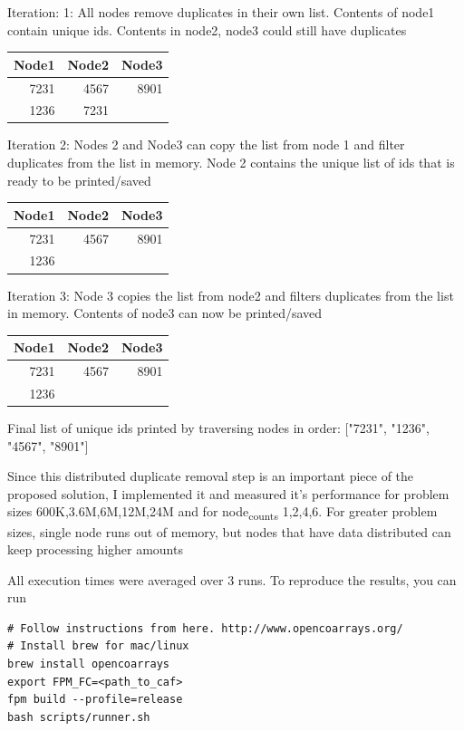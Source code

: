 \documentclass[11pt]{article}
\begin{document}
Iteration: 1: All nodes remove duplicates in their own list. Contents
of node1 contain unique ids. Contents in node2,
node3 could still have duplicates
\begin{center}
\begin{tabular}{rrr}
Node1 & Node2 & Node3\\
\hline
7231 & 4567 & 8901\\
1236 & 7231 & \\
\end{tabular}
\end{center}

Iteration 2: Nodes 2 and Node3 can copy the list from node 1 and
filter duplicates from the list in memory. Node 2 contains the
unique list of ids that is ready to be printed/saved
\begin{center}
\begin{tabular}{rrr}
Node1 & Node2 & Node3\\
\hline
7231 & 4567 & 8901\\
1236 &  & \\
\end{tabular}
\end{center}
Iteration 3: Node 3 copies the list from node2 and filters duplicates
from the list in memory. Contents of node3 can now be printed/saved
\begin{center}
\begin{tabular}{rrr}
Node1 & Node2 & Node3\\
\hline
7231 & 4567 & 8901\\
1236 &  & \\
\end{tabular}
\end{center}

Final list of unique ids printed by traversing nodes in order:
["7231", "1236", "4567", "8901"]

Since this distributed duplicate removal step is an important piece of
the proposed solution, I implemented it and measured it's performance
for problem sizes 600K,3.6M,6M,12M,24M and for node\textsubscript{counts}
1,2,4,6. For greater problem sizes, single node runs out of memory,
but nodes that have data distributed can keep processing higher amounts

All execution times were averaged over 3 runs. To reproduce the
results, you can run
\begin{verbatim}
# Follow instructions from here. http://www.opencoarrays.org/
# Install brew for mac/linux 
brew install opencoarrays
export FPM_FC=<path_to_caf>
fpm build --profile=release
bash scripts/runner.sh
\end{verbatim}
\end{document}
